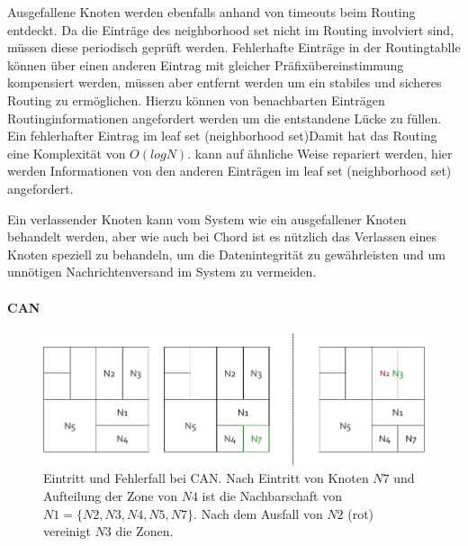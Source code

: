 Ausgefallene Knoten werden ebenfalls anhand von timeouts beim Routing entdeckt. Da die Einträge des neighborhood set nicht im Routing involviert sind, müssen diese periodisch geprüft werden. Fehlerhafte Einträge in der Routingtablle können über einen anderen Eintrag mit gleicher Präfixübereinstimmung kompensiert werden, müssen aber entfernt werden um ein stabiles und sicheres Routing zu ermöglichen. Hierzu können von benachbarten Einträgen Routinginformationen angefordert werden um die entstandene Lücke zu füllen. Ein fehlerhafter Eintrag im leaf set (neighborhood set)Damit hat das Routing eine Komplexität von $O(log N)$. kann auf ähnliche Weise repariert werden, hier werden Informationen von den anderen Einträgen im leaf set  (neighborhood set) angefordert.

Ein verlassender Knoten kann vom System wie ein ausgefallener Knoten behandelt werden, aber wie auch bei Chord ist es nützlich das Verlassen eines Knoten speziell zu behandeln, um die Datenintegrität zu gewährleisten und um unnötigen Nachrichtenversand im System zu vermeiden.

\paragraph{CAN}
\begin{figure}[htbp]
\centering
\includegraphics{grafics/can_new_node.pdf}
\caption{Eintritt und Fehlerfall bei CAN. Nach Eintritt von Knoten $N7$ und Aufteilung der Zone von $N4$ ist die Nachbarschaft von $N1 = \{N2, N3, N4, N5, N7\}$. Nach dem Ausfall von $N2$ (rot) vereinigt $N3$ die Zonen.}
\label{fig:can_new_node}
\end{figure}

